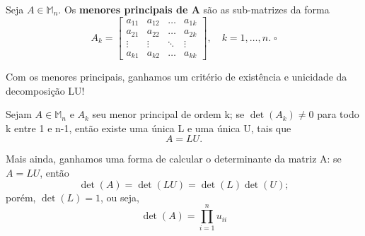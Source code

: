 \documentclass[../numerical_methods.tex]{subfiles}
\begin{document}
\begin{def*}
	Seja \(A\in \mathbb{M}_{n}\). Os \textbf{menores principais de A} são as sub-matrizes da forma
	\[
		A_{k} = \begin{bmatrix}
			a_{11} & a_{12} & \dotsc & a_{1k} \\
			a_{21} & a_{22} & \dotsc & a_{2k} \\
			\vdots & \vdots & \ddots & \vdots \\
			a_{k1} & a_{k2} & \dotsc & a_{kk}
		\end{bmatrix}, \quad k=1, \dotsc , n.\; \square
	\]
\end{def*}
Com os menores principais, ganhamos um critério de existência e unicidade da decomposição LU!
\begin{theorem*}
	Sejam \(A\in \mathbb{M}_{n}\) e \(A_{k}\) seu menor principal de ordem k; se \(\det{(A_{k})}\neq 0\) para todo k entre 1 e n-1, então existe uma única L e uma única U, tais que
	\[
		A = LU.
	\]
\end{theorem*}
Mais ainda, ganhamos uma forma de calcular o determinante da matriz A: se \(A = LU\), então
\[
	\det{(A)} = \det{(LU)} = \det{(L)} \det{(U)};
\]
porém, \(\det{(L)} = 1\), ou seja,
\[
	\det{(A)} = \prod\limits_{i=1}^{n}u_{ii}
\]
\end{document}
